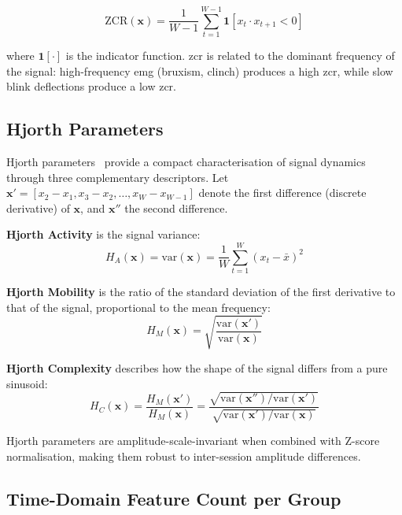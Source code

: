 \begin{equation}
\text{ZCR}(\mathbf{x}) = \frac{1}{W-1}
\sum_{t=1}^{W-1} \mathbf{1}\left[x_t \cdot x_{t+1} < 0\right]
\label{eq:zcr}
\end{equation}

\noindent where $\mathbf{1}[\cdot]$ is the indicator function.
\acrshort{zcr} is related to the dominant frequency of the
signal: high-frequency \acrshort{emg} (bruxism, clinch) produces
a high \acrshort{zcr}, while slow blink deflections produce
a low \acrshort{zcr}.

\subsection{Hjorth Parameters}

Hjorth parameters~\cite{hjorth1970eeg} provide a compact
characterisation of signal dynamics through three
complementary descriptors. Let $\mathbf{x}' = [x_2 - x_1,
x_3 - x_2, \ldots, x_W - x_{W-1}]$ denote the first
difference (discrete derivative) of $\mathbf{x}$, and
$\mathbf{x}''$ the second difference.

\textbf{Hjorth Activity} is the signal variance:
\begin{equation}
H_A(\mathbf{x}) = \text{var}(\mathbf{x})
= \frac{1}{W}\sum_{t=1}^{W}(x_t - \bar{x})^2
\label{eq:hjorth_activity}
\end{equation}

\textbf{Hjorth Mobility} is the ratio of the standard
deviation of the first derivative to that of the signal,
proportional to the mean frequency:
\begin{equation}
H_M(\mathbf{x}) = \sqrt{\frac{\text{var}(\mathbf{x}')}
{\text{var}(\mathbf{x})}}
\label{eq:hjorth_mobility}
\end{equation}

\textbf{Hjorth Complexity} describes how the shape of the
signal differs from a pure sinusoid:
\begin{equation}
H_C(\mathbf{x}) = \frac{H_M(\mathbf{x}')}
{H_M(\mathbf{x})}
= \frac{\sqrt{\text{var}(\mathbf{x}'')/
\text{var}(\mathbf{x}')}}
{\sqrt{\text{var}(\mathbf{x}')/\text{var}(\mathbf{x})}}
\label{eq:hjorth_complexity}
\end{equation}

Hjorth parameters are amplitude-scale-invariant when combined
with Z-score normalisation, making them robust to inter-session
amplitude differences.

\subsection{Time-Domain Feature Count per Group}

